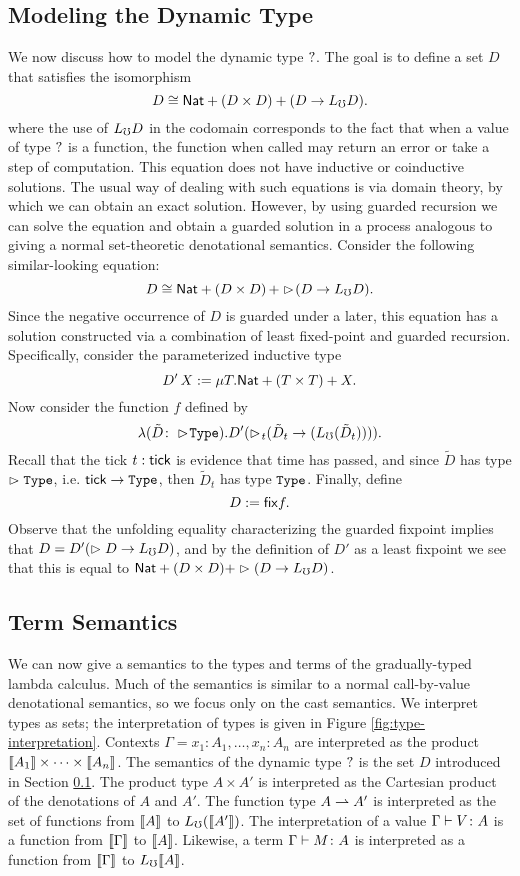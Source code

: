 \subsection{Modeling the Dynamic Type}\label{sec:dynamic-type}

We now discuss how to model the dynamic type $?$.
The goal is to define a set $D$ that satisfies the isomorphism
%
\[ D \cong \mathsf{Nat} + (D \times D) + (D \to L_\mho D). \]
%
where the use of $L_\mho D$ in the codomain corresponds to the fact that when a
value of type $?$ is a function, the function when called may return an error
or take a step of computation. This equation does not have inductive or
coinductive solutions. The usual way of dealing with such equations is via
domain theory, by which we can obtain an exact solution. However, by using
guarded recursion we can solve the equation and obtain a guarded solution in a
process analogous to giving a normal set-theoretic denotational semantics.
Consider the following similar-looking equation:
%
\[ D \cong \mathsf{Nat} + (D \times D)\, + \vartriangleright \hspace{-0.2em} (D \to L_\mho D). \]
%
Since the negative occurrence of $D$ is guarded under a later, this equation has
a solution constructed via a combination of least fixed-point and guarded
recursion. Specifically, consider the parameterized inductive type
%
\[ D'\, X := \mu T. \mathsf{Nat} + (T \times T) + X. \]
%
Now consider the function $f$ defined by
%
\[ \lambda (\tilde{D} \colon \vartriangleright \hspace{-0.2em} \texttt{Type}) . D' (\vartriangleright \hspace{-0.2em}_t (\tilde{D}_t \to (L_\mho (\tilde{D}_t)))). \]
%
Recall that the tick $t : \mathsf{tick}$ is evidence that time has passed, and since
$\tilde{D}$ has type $\vartriangleright \texttt{Type}$, i.e. $\mathsf{tick} \to \texttt{Type}$, then $\tilde{D}_t$
has type $\texttt{Type}$.
%
Finally, define 
\[ D := \mathsf{fix} f. \]
%
Observe that the unfolding equality characterizing the guarded fixpoint implies
that $D = D' (\vartriangleright D \to L_\mho D)$, and by the definition of $D'$ as a least
fixpoint we see that this is equal to $\mathsf{Nat} + (D \times D) + \vartriangleright (D \to L_\mho
D)$.


\subsection{Term Semantics}\label{sec:term-interpretation}

We can now give a semantics to the types and terms of the gradually-typed lambda
calculus. 
%
Much of the semantics is similar to a normal call-by-value denotational
semantics, so we focus only on the cast semantics. We interpret types as sets;
the interpretation of types is given in Figure \ref{fig:type-interpretation}.
Contexts $\Gamma = x_1 \colon A_1, \dots, x_n \colon A_n$ are interpreted as the
product $\llbracket {A_1} \rrbracket \times \cdots \times \llbracket {A_n} \rrbracket$. The semantics of the dynamic
type $?$ is the set $D$ introduced in Section \ref{sec:dynamic-type}. The
product type $A \times A'$ is interpreted as the Cartesian product of the
denotations of $A$ and $A'$. The function type $A \rightharpoonup A'$ is interpreted as the
set of functions from $\llbracket {A} \rrbracket$ to $L_\mho (\llbracket {A'} \rrbracket)$.
%
The interpretation of a value ${\Gamma} \vdash {V} \colon {A}$ is a function from
$\llbracket {\Gamma} \rrbracket$ to $\llbracket {A} \rrbracket$. Likewise, a term ${\Gamma} \vdash {M} \colon {{A}}$ is
interpreted as a function from $\llbracket {\Gamma} \rrbracket$ to $L_\mho \llbracket {A} \rrbracket$.

